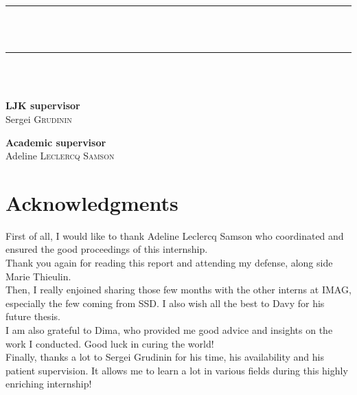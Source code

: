 \documentclass{article}
\makeatletter
\let\thetitle\@title
\let\theauthor\@author
\makeatother
\begin{document}
\begin{titlepage}
\begin{center}
	    \rule{\linewidth}{0.2 mm} \\[1 cm]
	    {\huge \bfseries \thetitle}\\[.7 cm]
	    \rule{\linewidth}{0.2 mm} \\[1.5 cm]
    	
    	{\Large \theauthor}\\[1.5 cm]
    \end{center}
    
	\begin{minipage}{0.5\textwidth}
		\begin{flushleft} \large
		    \textbf{LJK supervisor}\\
		    Sergei \textsc{Grudinin}\\
		\end{flushleft}
	\end{minipage}
	\begin{minipage}{0.5\textwidth}
        \begin{flushright} \large
			\textbf{Academic supervisor} \\
			Adeline \textsc{Leclercq Samson}\\
		\end{flushright}
	\end{minipage}
\end{titlepage}
\restoregeometry
\pagebreak

\section*{Acknowledgments}

First of all, I would like to thank Adeline Leclercq Samson who coordinated and ensured the good proceedings of this internship. \\
Thank you again for reading this report and attending my defense, along side Marie Thieulin. \\

Then, I really enjoined sharing those few months with the other interns at IMAG, especially the few coming from SSD. I also wish all the best to Davy for his future thesis. \\
I am also grateful to Dima, who provided me good advice and insights on the work I conducted. Good luck in curing the world! \\

Finally, thanks a lot to Sergei Grudinin for his time, his availability and his patient supervision. It allows me to learn a lot in various fields during this highly enriching internship!
\end{document}
